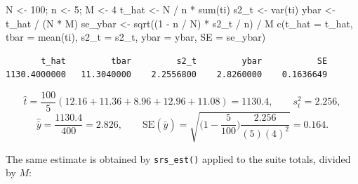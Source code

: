 \documentclass[
  letterpaper,
  DIV=11,
  numbers=noendperiod]{scrreprt}
\newenvironment{Shaded}{\begin{snugshade}}{\end{snugshade}}
\newcommand{\AttributeTok}[1]{\textcolor[rgb]{0.40,0.45,0.13}{#1}}
\newcommand{\ConstantTok}[1]{\textcolor[rgb]{0.56,0.35,0.01}{#1}}
\newcommand{\DecValTok}[1]{\textcolor[rgb]{0.68,0.00,0.00}{#1}}
\newcommand{\FunctionTok}[1]{\textcolor[rgb]{0.28,0.35,0.67}{#1}}
\newcommand{\NormalTok}[1]{\textcolor[rgb]{0.00,0.23,0.31}{#1}}
\newcommand{\OtherTok}[1]{\textcolor[rgb]{0.00,0.23,0.31}{#1}}
\newcommand{\SpecialCharTok}[1]{\textcolor[rgb]{0.37,0.37,0.37}{#1}}
\newcommand{\StringTok}[1]{\textcolor[rgb]{0.13,0.47,0.30}{#1}}
\renewcommand{\[}{\begin{equation}}
\renewcommand{\]}{\end{equation}}
\begin{document}
\begin{Shaded}
\begin{Highlighting}[]
\NormalTok{N }\OtherTok{\textless{}{-}} \DecValTok{100}\NormalTok{; n }\OtherTok{\textless{}{-}} \DecValTok{5}\NormalTok{; M }\OtherTok{\textless{}{-}} \DecValTok{4}
\NormalTok{t\_hat  }\OtherTok{\textless{}{-}}\NormalTok{ N }\SpecialCharTok{/}\NormalTok{ n }\SpecialCharTok{*} \FunctionTok{sum}\NormalTok{(ti)}
\NormalTok{s2\_t   }\OtherTok{\textless{}{-}} \FunctionTok{var}\NormalTok{(ti)}
\NormalTok{ybar   }\OtherTok{\textless{}{-}}\NormalTok{ t\_hat }\SpecialCharTok{/}\NormalTok{ (N }\SpecialCharTok{*}\NormalTok{ M)}
\NormalTok{se\_ybar }\OtherTok{\textless{}{-}} \FunctionTok{sqrt}\NormalTok{((}\DecValTok{1} \SpecialCharTok{{-}}\NormalTok{ n }\SpecialCharTok{/}\NormalTok{ N) }\SpecialCharTok{*}\NormalTok{ s2\_t }\SpecialCharTok{/}\NormalTok{ n) }\SpecialCharTok{/}\NormalTok{ M}
\FunctionTok{c}\NormalTok{(}\AttributeTok{t\_hat =}\NormalTok{ t\_hat, }\AttributeTok{tbar =} \FunctionTok{mean}\NormalTok{(ti), }\AttributeTok{s2\_t =}\NormalTok{ s2\_t, }\AttributeTok{ybar =}\NormalTok{ ybar, }\AttributeTok{SE =}\NormalTok{ se\_ybar)}
\end{Highlighting}
\end{Shaded}

\begin{verbatim}
       t_hat         tbar         s2_t         ybar           SE 
1130.4000000   11.3040000    2.2556800    2.8260000    0.1636649 
\end{verbatim}

\[
\hat t = \frac{100}{5}(12.16+11.36+8.96+12.96+11.08) = 1130.4, \qquad
s_t^2 = 2.256,
\] \[
\hat{\bar y} = \frac{1130.4}{400} = 2.826, \qquad
\mathrm{SE}(\hat{\bar y}) = \sqrt{\Big(1-\frac{5}{100}\Big)\frac{2.256}{(5)(4)^2}} = 0.164 .
\]

The same estimate is obtained by \texttt{srs\_est()} applied to the
suite totals, divided by \(M\):

\begin{Shaded}
\end{Shaded}
\end{document}
